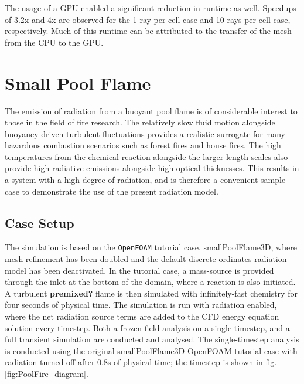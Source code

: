 The usage of a GPU enabled a significant reduction in runtime as well. Speedups of 3.2x and 4x are observed for the 1 ray per cell case and 10 rays per cell case, respectively.
Much of this runtime can be attributed to the transfer of the mesh from the CPU to the GPU.


\section{Small Pool Flame}\label{section:SmallPoolFlame}
The emission of radiation from a buoyant pool flame is of considerable interest to those in the field of fire research. 
The relatively slow fluid motion alongside buoyancy-driven turbulent fluctuations provides a realistic surrogate for many hazardous combustion scenarios such as forest fires and house fires.
The high temperatures from the chemical reaction alongside the larger length scales also provide high radiative emissions alongside high optical thicknesses. 
This results in a system with a high degree of radiation, and is therefore a convenient sample case to demonstrate the use of the present radiation model.

\subsection{Case Setup}
The simulation is based on the \verb|OpenFOAM| tutorial case, smallPoolFlame3D, where mesh refinement has been doubled and the default discrete-ordinates radiation model has been deactivated. 
In the tutorial case, a mass-source is provided through the inlet at the bottom of the domain, where a reaction is also initiated. A turbulent \textbf{premixed?} flame is then simulated with infinitely-fast chemistry for four seconds of physical time.
The simulation is run with radiation enabled, where the net radiation source terms are added to the CFD energy equation solution every timestep.
Both a frozen-field analysis on a single-timestep, and a full transient simulation are conducted and analysed. The single-timestep analysis is conducted using the original smallPoolFlame3D OpenFOAM tutorial case with radiation turned off after 0.8s of physical time; the timestep is shown in fig. \ref{fig:PoolFire_diagram}.

